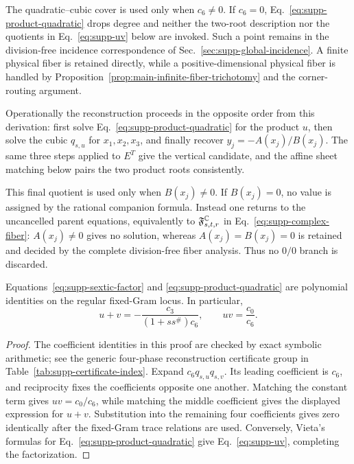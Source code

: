 The quadratic--cubic cover is used only when $c_6\neq0$.  If $c_6=0$, Eq.~\eqref{eq:supp-product-quadratic} drops degree and neither the two-root description nor the quotients in Eq.~\eqref{eq:supp-uv} below are invoked. {Such a point remains in the division-free incidence correspondence of Sec.~\ref{sec:supp-global-incidence}. A finite physical fiber is retained directly, while a positive-dimensional physical fiber is handled by Proposition~\ref{prop:main-infinite-fiber-trichotomy} and the corner-routing argument.}

Operationally the reconstruction proceeds in the opposite order from this derivation: first solve Eq.~\eqref{eq:supp-product-quadratic} for the product $u$, then solve the cubic $q_{s,u}$ for $x_1,x_2,x_3$, and finally recover $y_j=-A(x_j)/B(x_j)$. The same three steps applied to $E^T$ give the vertical candidate, and the affine sheet matching below pairs the two product roots consistently.

This final quotient is used only when $B(x_j)\neq0$.  If $B(x_j)=0$, no value is assigned by the rational companion formula.  Instead one returns to the uncancelled parent equations, equivalently to $\mathfrak F^{\mathbb C}_{s,t,r}$ in Eq.~\eqref{eq:supp-complex-fiber}: $A(x_j)\neq0$ gives no solution, whereas $A(x_j)=B(x_j)=0$ is retained and decided by the complete division-free fiber analysis.  Thus no $0/0$ branch is discarded.

\begin{lemma}
\label{lem:supp-product-factor}
Equations~\eqref{eq:supp-sextic-factor} and \eqref{eq:supp-product-quadratic} are polynomial identities on the regular fixed-Gram locus.  In particular,
\begin{equation}
u+v=-\frac{c_3}{(1+ss^\#)c_6},\qquad
uv=\frac{c_0}{c_6}.
\label{eq:supp-uv}
\end{equation}
\end{lemma}

\begin{proof}
The coefficient identities in this proof are checked by exact symbolic arithmetic; see the generic four-phase reconstruction certificate group in Table~\ref{tab:supp-certificate-index}.
Expand $c_6q_{s,u}q_{s,v}$.  Its leading coefficient is $c_6$, and reciprocity fixes the coefficients opposite one another.  Matching the constant term gives $uv=c_0/c_6$, while matching the middle coefficient gives the displayed expression for $u+v$. Substitution into the remaining four coefficients gives zero identically after the fixed-Gram trace relations are used. Conversely, Vieta's formulas for Eq.~\eqref{eq:supp-product-quadratic} give Eq.~\eqref{eq:supp-uv}, completing the factorization.
\end{proof}

